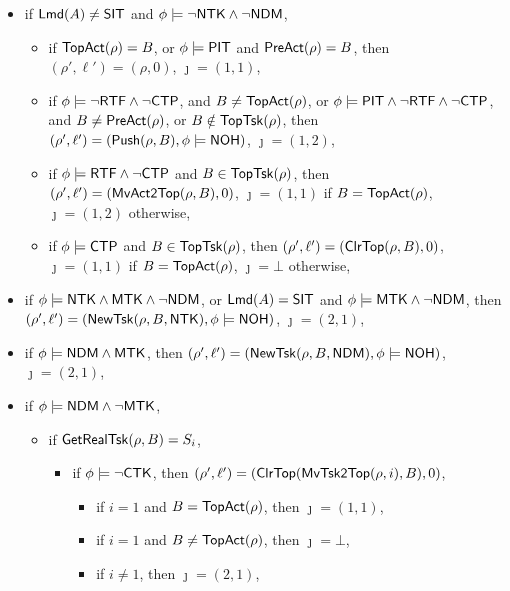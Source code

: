 {
\begin{itemize}
	\item if ${\sf Lmd}(A) \neq {\sf SIT}$ and $\phi \models \neg {\sf NTK}\wedge\neg{\sf NDM}$, 
	\begin{itemize}
		\item if $\mathsf{TopAct}(\rho) = B$, or $\phi\models{\sf PIT}$ and $\mathsf{PreAct}(\rho) = B$, then $(\rho',\ell')= (\rho,0)$, $\jmath = (1,1)$,
        \item if $\phi \models  \neg {\sf RTF}\wedge \neg {\sf CTP}$, and $B\neq\mathsf{TopAct}(\rho)$,
        or $\phi \models {\sf PIT}\wedge\neg {\sf RTF}\wedge \neg {\sf CTP}$, and $B\neq\mathsf{PreAct}(\rho)$,
        or $B\notin \mathsf{TopTsk}(\rho)$, then $(\rho',\ell')=(\mathsf{Push}(\rho, B),\phi\models{\sf NOH})$, $\jmath = (1,2)$,
        \item if $\phi \models {\sf RTF} \wedge \neg {\sf CTP}$ and $B \in \mathsf{TopTsk}(\rho)$, then
         $(\rho',\ell')=(\mathsf{MvAct2Top}(\rho, B),0)$, $\jmath = (1,1)$ if $B = \mathsf{TopAct}(\rho)$, $\jmath = (1,2)$ otherwise,
        \item if $\phi \models{\sf CTP}$ and $B \in \mathsf{TopTsk}(\rho)$, then
        $(\rho',\ell') =(\mathsf{ClrTop}(\rho, B),0)$, $\jmath = (1,1)$ if $B = \mathsf{TopAct}(\rho)$, $\jmath = \bot$ otherwise,
	\end{itemize}
	\item if $\phi \models {\sf NTK}\wedge  {\sf MTK}\wedge\neg{\sf NDM}$, or ${\sf Lmd}(A) = {\sf SIT}$ and $\phi \models {\sf MTK}\wedge\neg{\sf NDM}$,  then $(\rho',\ell') = (\mathsf{NewTsk}(\rho, B, {\sf NTK}),\phi\models{\sf NOH})$, $\jmath = (2,1)$,
	\item if $\phi \models {\sf NDM}\wedge  {\sf MTK}$, then $(\rho',\ell') = (\mathsf{NewTsk}(\rho, B, {\sf NDM}),\phi\models{\sf NOH})$, $\jmath = (2,1)$,
	\item if $\phi \models {\sf NDM}\wedge\neg{\sf MTK}$, 
    \begin{itemize}
        \item if $\mathsf{GetRealTsk}(\rho,B) = S_i$, 
        \begin{itemize}
            \item if $\phi\models\neg{\sf CTK}$, then $(\rho',\ell')=(\mathsf{ClrTop}(\mathsf{MvTsk2Top}(\rho,i), B),0)$, 
			\begin{itemize}
				\item if $i = 1$ and $B = \mathsf{TopAct}(\rho)$, then $\jmath = (1,1)$,
				\item if $i = 1$ and $B \neq \mathsf{TopAct}(\rho)$, then $\jmath = \bot$,
				\item if $i \neq 1$, then $\jmath = (2,1)$,

\end{itemize}
\end{itemize}
\end{itemize}
\end{itemize}}
